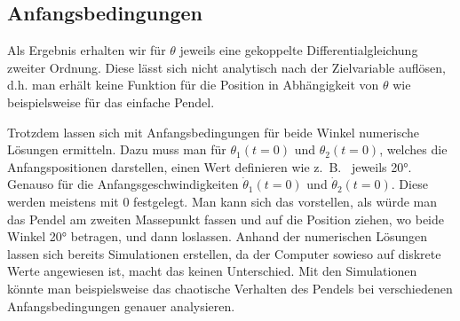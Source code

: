 \subsection{Anfangsbedingungen}
Als Ergebnis erhalten wir für \(\theta\) jeweils eine gekoppelte Differentialgleichung zweiter Ordnung.
Diese lässt sich nicht analytisch nach der Zielvariable auflösen,
d.h. man erhält keine Funktion für die Position in Abhängigkeit von \(\theta\) 
wie beispielsweise für das einfache Pendel.

Trotzdem lassen sich mit Anfangsbedingungen für beide Winkel numerische Lösungen ermitteln.
Dazu muss man für \(\theta_1(t=0)\) und \(\theta_2(t=0)\), welches die Anfangspositionen darstellen,
einen Wert definieren wie z.~B.~ jeweils 20°. Genauso für die Anfangsgeschwindigkeiten \(\dot{\theta}_1(t=0)\)
und \(\dot{\theta}_2(t=0)\).
Diese werden meistens mit 0 festgelegt. Man kann sich das vorstellen, als würde man das Pendel
am zweiten Massepunkt fassen und auf die Position ziehen, wo beide Winkel 20° betragen, und dann loslassen.
Anhand der numerischen Lösungen lassen sich bereits Simulationen erstellen, da der Computer
sowieso auf diskrete Werte angewiesen ist, macht das keinen Unterschied.
Mit den Simulationen könnte man beispielsweise das chaotische Verhalten des Pendels bei verschiedenen 
Anfangsbedingungen genauer analysieren.

